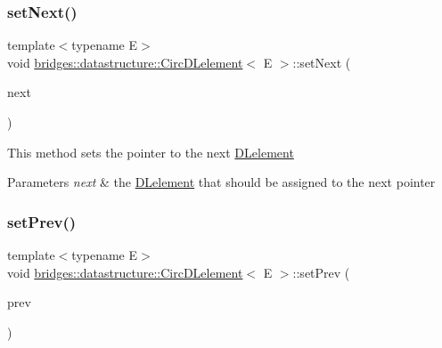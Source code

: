 \subsubsection{\texorpdfstring{setNext()}{setNext()}}
{\footnotesize\ttfamily template$<$typename E$>$ \\
void \mbox{\hyperlink{classbridges_1_1datastructure_1_1_circ_d_lelement}{bridges\+::datastructure\+::\+Circ\+D\+Lelement}}$<$ E $>$\+::set\+Next (\begin{DoxyParamCaption}\item[{\mbox{\hyperlink{classbridges_1_1datastructure_1_1_circ_d_lelement}{Circ\+D\+Lelement}}$<$ E $>$ $\ast$}]{next }\end{DoxyParamCaption})\hspace{0.3cm}{\ttfamily [inline]}}

This method sets the pointer to the next \mbox{\hyperlink{classbridges_1_1datastructure_1_1_d_lelement}{D\+Lelement}}


\begin{DoxyParams}{Parameters}
{\em next} & the \mbox{\hyperlink{classbridges_1_1datastructure_1_1_d_lelement}{D\+Lelement}} that should be assigned to the next pointer \\
\hline
\end{DoxyParams}
\mbox{\label{classbridges_1_1datastructure_1_1_circ_d_lelement_ac47b0221a0eebc3c539eec1700f2c776}} 
\subsubsection{\texorpdfstring{setPrev()}{setPrev()}}
{\footnotesize\ttfamily template$<$typename E$>$ \\
void \mbox{\hyperlink{classbridges_1_1datastructure_1_1_circ_d_lelement}{bridges\+::datastructure\+::\+Circ\+D\+Lelement}}$<$ E $>$\+::set\+Prev (\begin{DoxyParamCaption}\item[{\mbox{\hyperlink{classbridges_1_1datastructure_1_1_circ_d_lelement}{Circ\+D\+Lelement}}$<$ E $>$ $\ast$}]{prev }\end{DoxyParamCaption})\hspace{0.3cm}{\ttfamily [inline]}}

